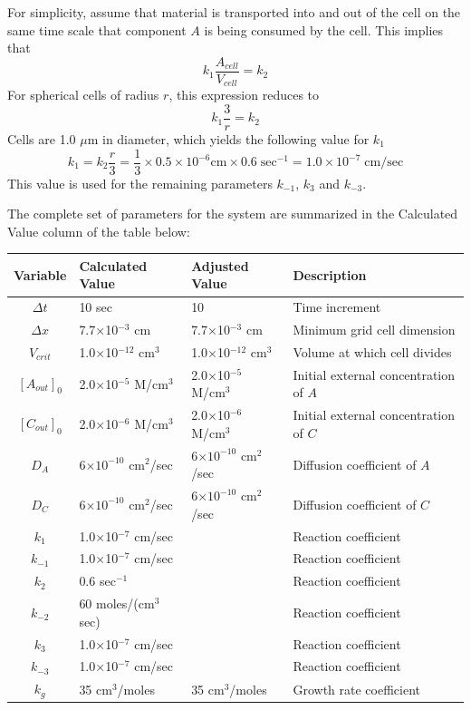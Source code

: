 \documentclass[12pt]{article}
\begin{document}
For simplicity, assume that material is transported into and out of the cell on the same time scale
that component $A$ is being consumed by the cell. This implies that
\[
k_1\frac{A_{cell}}{V_{cell}} = k_2
\]
For spherical cells of radius $r$, this expression reduces to
\[
k_1\frac{3}{r} = k_2
\]
Cells are 1.0 $\mu$m in diameter, which yields the following value for $k_1$
\[
k_1 = k_2\frac{r}{3} = \frac{1}{3}\times 0.5\times 10^{-6}\mbox{cm}\times 0.6\;\mbox{sec}^{-1}=1.0\times
10^{-7}\;\mbox{cm/sec} 
\]
This value is used for the remaining parameters $k_{-1}$, $k_3$ and $k_{-3}$.

The complete set of parameters for the system are summarized in the Calculated Value column
of the table below:

\begin{tabular}{|c|l|l|l|}
\hline
Variable & Calculated Value & Adjusted Value & Description \\
\hline
$\Delta t$ & 10 sec & 10 & Time increment \\
$\Delta x$ & 7.7$\times$10$^{-3}$ cm & 7.7$\times$10$^{-3}$ cm& Minimum grid cell dimension \\
$V_{crit}$ & 1.0$\times$10$^{-12}$ cm$^3$ & 1.0$\times$10$^{-12}$ cm$^3$
    &  Volume at which cell divides \\
$[A_{out}]_0$ & 2.0$\times$10$^{-5}$ M/cm$^3$ & 2.0$\times$10$^{-5}$ M/cm$^3$
    & Initial external concentration of $A$ \\
$[C_{out}]_0$ & 2.0$\times$10$^{-6}$ M/cm$^3$ & 2.0$\times$10$^{-6}$ M/cm$^3$
    & Initial external concentration of $C$ \\
$D_A$ & 6$\times 10^{-10}$ cm$^2$/sec & 6$\times 10^{-10}$ cm$^2$/sec & Diffusion coefficient of $A$ \\
$D_C$ & 6$\times 10^{-10}$ cm$^2$/sec & 6$\times 10^{-10}$ cm$^2$/sec & Diffusion coefficient of $C$ \\
$k_1$ & 1.0$\times$10$^{-7}$ cm/sec &\color{red}{2.0$\times$10$^{-5}$ cm/sec} & Reaction coefficient \\
$k_{-1}$ & 1.0$\times$10$^{-7}$ cm/sec &\color{red}{2.0$\times$10$^{-5}$ cm/sec} & Reaction coefficient \\
$k_2$ & 0.6 sec$^{-1}$ &\color{red}{0.4 sec$^{-1}$} & Reaction coefficient \\
$k_{-2}$ & 60 moles/(cm$^3$ sec) &\color{red}{0.06 moles/(cm$^3$ sec)} & Reaction coefficient \\
$k_3$ & 1.0$\times$10$^{-7}$ cm/sec &\color{red}{2.0$\times$10$^{-5}$ cm/sec} & Reaction coefficient \\
$k_{-3}$ & 1.0$\times$10$^{-7}$ cm/sec &\color{red}{2.0$\times$10$^{-5}$ cm/sec} & Reaction coefficient \\
$k_g$ & 35 cm$^3$/moles & 35 cm$^3$/moles & Growth rate coefficient \\
\hline
\end{tabular}
\end{document}
